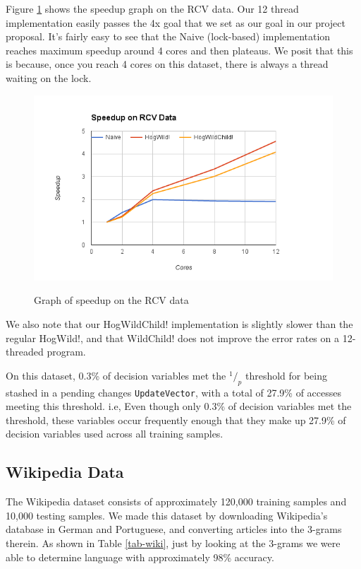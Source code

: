 \documentclass{article}
\newcommand*\rfrac[2]{{}^{#1}\!/_{#2}}
\begin{document}
Figure \ref{rcv} shows the speedup graph on the RCV data.
Our 12 thread implementation easily passes the 4x goal that we set as
our goal in our project proposal.
It's fairly easy to see that the Naive (lock-based) implementation
reaches maximum speedup around 4 cores and then plateaus.
We posit that this is because, once you reach 4 cores on this dataset,
there is always a thread waiting on the lock.

\begin{figure}[h!]
\centering
\includegraphics[width=\textwidth]{img/rcv_graph.png}
\label{rcv}
\caption{Graph of speedup on the RCV data}
\end{figure}

We also note that our HogWildChild! implementation is slightly slower
than the regular HogWild!, and that WildChild! does not improve the
error rates on a 12-threaded program.

On this dataset, 0.3\% of decision variables met the $\rfrac 1 p$
threshold for being stashed in a pending changes \texttt{UpdateVector},
with a total of 27.9\% of accesses meeting this threshold.
i.e, Even though only 0.3\% of decision variables met the threshold,
these variables occur frequently enough that they make up
27.9\% of decision variables used across all training samples.

\subsection{Wikipedia Data}

The Wikipedia dataset consists of approximately 120,000 training samples
and 10,000 testing samples.
We made this dataset by downloading Wikipedia's database in German and
Portuguese, and converting articles into the 3-grams therein.
As shown in Table \ref{tab-wiki}, just by looking at the 3-grams we were
able to determine language with approximately 98\% accuracy.
\end{document}
